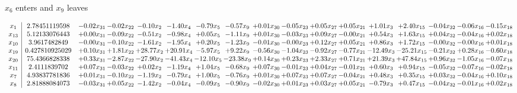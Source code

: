 \documentclass[9pt]{article}
\begin{document}
 $ x_{6} $ enters and $ x_{9} $ leaves 

 \[\begin{array}{c| c c@{\hskip 2pt} c@{\hskip 2pt} c@{\hskip 2pt} c@{\hskip 2pt} c@{\hskip 2pt} c@{\hskip 2pt} c@{\hskip 2pt} c@{\hskip 2pt} c@{\hskip 2pt} c@{\hskip 2pt} c@{\hskip 2pt} c@{\hskip 2pt} c@{\hskip 2pt} c@{\hskip 2pt} c@{\hskip 2pt} }
 x_{1}   &  2.78451119598 & -0.02 x_{31} & -0.02 x_{22} & -0.10 x_{2} & -1.40 x_{4} & -0.79 x_{5} & -0.57 x_{9} & +  0.01 x_{30} & -0.05 x_{23} & +  0.05 x_{27} & +  0.05 x_{21} & +  1.01 x_{3} & +  2.40 x_{15} & -0.04 x_{32} & -0.06 x_{16} & -0.15 x_{18}\\
 x_{13}   &  5.12133076443 & +  0.00 x_{31} & -0.09 x_{22} & -0.51 x_{2} & -0.98 x_{4} & +  0.05 x_{5} & -1.11 x_{9} & +  0.01 x_{30} & -0.03 x_{23} & +  0.09 x_{27} & -0.00 x_{21} & +  0.54 x_{3} & +  1.63 x_{15} & +  0.04 x_{32} & -0.04 x_{16} & +  0.02 x_{18}\\
 x_{10}   &  3.9617482849 & -0.00 x_{31} & -0.10 x_{22} & -1.61 x_{2} & -1.95 x_{4} & +  0.20 x_{5} & -1.23 x_{9} & -0.01 x_{30} & -0.00 x_{23} & +  0.12 x_{27} & +  0.05 x_{21} & +  0.86 x_{3} & +  1.72 x_{15} & -0.00 x_{32} & -0.00 x_{16} & +  0.01 x_{18}\\
 x_{19}   &  0.427810925029 & +  0.10 x_{31} & +  1.81 x_{22} & + 28.77 x_{2} & + 20.91 x_{4} & -5.97 x_{5} & +  9.22 x_{9} & -0.56 x_{30} & -1.04 x_{23} & -0.92 x_{27} & -0.77 x_{21} & -12.49 x_{3} & -25.21 x_{15} & -0.21 x_{32} & +  0.28 x_{16} & -0.60 x_{18}\\
 x_{20}   &  75.4366828338 & +  0.33 x_{31} & -2.87 x_{22} & -27.90 x_{2} & -41.43 x_{4} & -12.10 x_{5} & -23.38 x_{9} & +  0.14 x_{30} & +  0.23 x_{23} & +  2.33 x_{27} & +  0.71 x_{21} & + 21.39 x_{3} & + 47.84 x_{15} & +  0.96 x_{32} & -1.05 x_{16} & -0.07 x_{18}\\
 x_{11}   &  2.4111839702 & +  0.07 x_{31} & -0.03 x_{22} & +  0.02 x_{2} & -1.19 x_{4} & +  1.04 x_{5} & -0.68 x_{9} & +  0.07 x_{30} & -0.01 x_{23} & +  0.04 x_{27} & -0.01 x_{21} & +  0.60 x_{3} & +  0.94 x_{15} & -0.05 x_{32} & -0.07 x_{16} & -0.02 x_{18}\\
 x_{7}   &  4.93837781836 & +  0.01 x_{31} & -0.10 x_{22} & -1.19 x_{2} & -0.79 x_{4} & +  1.00 x_{5} & -0.76 x_{9} & +  0.01 x_{30} & +  0.07 x_{23} & +  0.07 x_{27} & -0.04 x_{21} & +  0.48 x_{3} & +  0.35 x_{15} & +  0.03 x_{32} & -0.04 x_{16} & +  0.10 x_{18}\\
 x_{8}   &  2.81888084073 & -0.03 x_{31} & +  0.05 x_{22} & -1.42 x_{2} & -0.04 x_{4} & -0.09 x_{5} & -0.90 x_{9} & -0.02 x_{30} & +  0.01 x_{23} & +  0.03 x_{27} & +  0.05 x_{21} & -0.79 x_{3} & +  0.47 x_{15} & -0.04 x_{32} & -0.01 x_{16} & +  0.02 x_{18}\\

\end{array}\]
\end{document}
